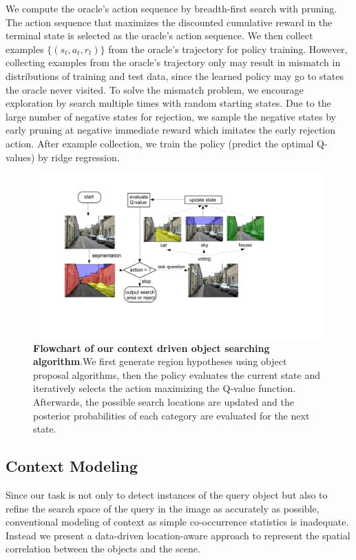 We compute the oracle's action sequence by breadth-first
search with pruning. The action sequence that maximizes the discounted
cumulative reward in the terminal state is selected as the oracle's action
sequence.
We then collect examples $\{(s_t,a_t,r_t)\}$ from the oracle's trajectory for
policy training.
However, collecting examples from the oracle's trajectory
only may result in mismatch in distributions of training and test data, since
the learned policy may go to states the oracle never visited.
To solve the mismatch problem, we encourage exploration by search multiple
times with random starting states.  Due to the large number of negative states for rejection, we sample the negative states by early pruning at negative immediate reward which imitates the early rejection action. After example collection, we train the policy (predict the optimal Q-values) by
ridge regression.

\begin{figure}[htb]
\begin{center}
\includegraphics[width=0.8\linewidth]{figures/flowchart_Q.pdf}
\caption{{\bf Flowchart of our context driven object searching algorithm}.We first generate region hypotheses using object proposal algorithms, then the policy evaluates the current state and iteratively selects the action maximizing the Q-value function. Afterwards, the possible search locations are updated and the posterior probabilities of each category are evaluated for the next state.
}
\label{fig:flowchart}
\end{center}\vspace{-1.8em}
\end{figure}

\subsection{Context Modeling}
\label{sec:context}
Since our task is not only to detect instances of the query object but also to refine the search space of the query in the image as accurately as possible, conventional modeling of context as simple co-occurrence statistics is inadequate. Instead we present a data-driven location-aware approach to represent the spatial correlation between the objects and the scene. 

